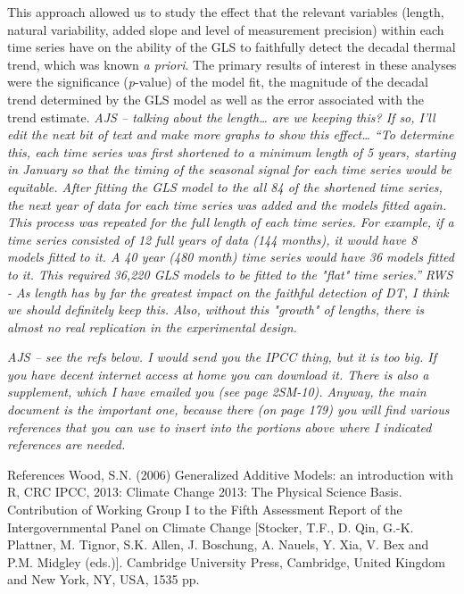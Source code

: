 \documentclass{ametsoc}
\begin{document}
This approach allowed us to study the effect that the relevant variables (length, natural variability, added slope and level of measurement precision) within each time series have on the ability of the GLS to faithfully detect the decadal thermal trend, which was known \emph{a priori}. The primary results of interest in these analyses were the significance (\emph{p}-value) of the model fit, the magnitude of the decadal trend determined by the GLS model as well as the error associated with the trend estimate. \emph{AJS – talking about the length… are we keeping this? If so, I’ll edit the next bit of text and make more graphs to show this effect… “To determine this, each time series was first shortened to a minimum length of 5 years, starting in January so that the timing of the seasonal signal for each time series would be equitable. After fitting the GLS model to the all 84 of the shortened time series, the next year of data for each time series was added and the models fitted again. This process was repeated for the full length of each time series. For example, if a time series consisted of 12 full years of data (144 months), it would have 8 models fitted to it. A 40 year (480 month) time series would have 36 models fitted to it. This required 36,220 GLS models to be fitted to the "flat" time series.”}
\emph{RWS - As length has by far the greatest impact on the faithful detection of DT, I think we should definitely keep this. Also, without this "growth" of lengths, there is almost no real replication in the experimental design.}

\emph{AJS – see the refs below. I would send you the IPCC thing, but it is too big. If you have decent internet access at home you can download it. There is also a supplement, which I have emailed you (see page 2SM-10). Anyway, the main document is the important one, because there (on page 179) you will find various references that you can use to insert into the portions above where I indicated references are needed.}

References
Wood, S.N. (2006) Generalized Additive Models: an introduction with R, CRC
IPCC, 2013: Climate Change 2013: The Physical Science Basis. Contribution of Working Group I to the Fifth Assessment Report of the Intergovernmental Panel on Climate Change [Stocker, T.F., D. Qin, G.-K. Plattner, M. Tignor, S.K. Allen, J. Boschung, A. Nauels, Y. Xia, V. Bex and P.M. Midgley (eds.)]. Cambridge University Press, Cambridge, United Kingdom and New York, NY, USA, 1535 pp. 
\end{document}
